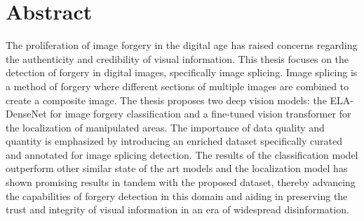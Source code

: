 \chapter*{Abstract}
\label{chap:abstract}


The proliferation of image forgery in the digital age has raised concerns regarding the authenticity and credibility of visual information. This thesis focuses on the detection of forgery in digital images, specifically image splicing. Image splicing is a method of forgery where different sections of multiple images are combined to create a composite image. The thesis proposes two deep vision models: the ELA-DenseNet for image forgery classification and a fine-tuned vision transformer for the localization of manipulated areas. The importance of data quality and quantity is emphasized by introducing an enriched dataset specifically curated and annotated for image splicing detection. The results of the classification model outperform other similar state of the art models and the localization model has shown promising results in tandem with the proposed dataset, thereby advancing the capabilities of forgery detection in this domain and aiding in preserving the trust and integrity of visual information in an era of widespread disinformation.

